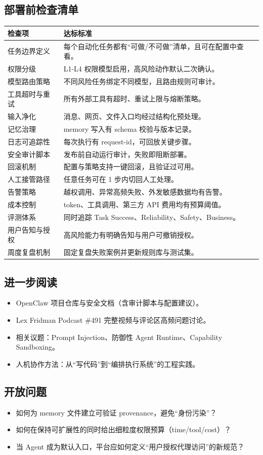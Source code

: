 \documentclass[a4paper]{article}
\begin{document}
\subsection{部署前检查清单}
\begin{longtable}{p{}p{}}
\toprule
\textbf{检查项} & \textbf{达标标准} \\
\midrule
任务边界定义 & 每个自动化任务都有“可做/不可做”清单，且可在配置中查看。 \\
\midrule
权限分级 & L1-L4 权限模型启用，高风险动作默认二次确认。 \\
\midrule
模型路由策略 & 不同风险任务绑定不同模型，且路由规则可审计。 \\
\midrule
工具超时与重试 & 所有外部工具有超时、重试上限与熔断策略。 \\
\midrule
输入净化 & 消息、网页、文件入口均经过结构化预处理。 \\
\midrule
记忆治理 & memory 写入有 schema 校验与版本记录。 \\
\midrule
日志可追踪性 & 每次执行有 request-id，可回放关键步骤。 \\
\midrule
安全审计脚本 & 发布前自动运行审计，失败即阻断部署。 \\
\midrule
回滚机制 & 配置与策略支持一键回滚，且验证过可用。 \\
\midrule
人工接管路径 & 任意任务可在 1 步内切回人工处理。 \\
\midrule
告警策略 & 越权调用、异常高频失败、外发敏感数据均有告警。 \\
\midrule
成本控制 & token、工具调用、第三方 API 费用均有预算阈值。 \\
\midrule
评测体系 & 同时追踪 Task Success、Reliability、Safety、Business。 \\
\midrule
用户告知与授权 & 高风险能力有明确告知与用户可撤销授权。 \\
\midrule
周度复盘机制 & 固定复盘失败案例并更新规则库与测试集。 \\
\bottomrule
\end{longtable}

\subsection{进一步阅读}
\begin{itemize}
    \item OpenClaw 项目仓库与安全文档（含审计脚本与配置建议）。
    \item Lex Fridman Podcast \#491 完整视频与评论区高频问题讨论。
    \item 相关议题：Prompt Injection、防御性 Agent Runtime、Capability Sandboxing。
    \item 人机协作方法：从“写代码”到“编排执行系统”的工程实践。
\end{itemize}

\subsection{开放问题}
\begin{itemize}
    \item 如何为 memory 文件建立可验证 provenance，避免“身份污染”？
    \item 如何在保持可扩展性的同时给出细粒度权限预算（time/tool/cost）？
    \item 当 Agent 成为默认入口，平台应如何定义“用户授权代理访问”的新规范？
\end{itemize}
\end{document}
